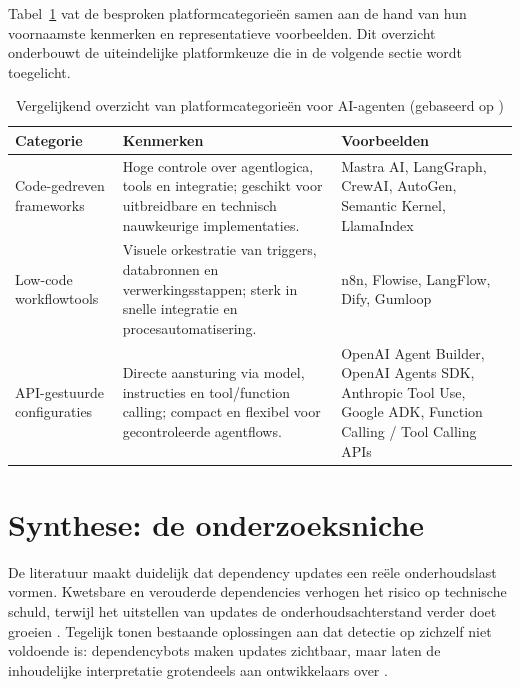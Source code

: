 Tabel~\ref{tab:platformcategorieen} vat de besproken platformcategorieën samen aan de hand van hun voornaamste kenmerken en representatieve voorbeelden. Dit overzicht onderbouwt de uiteindelijke platformkeuze die in de volgende sectie wordt toegelicht.

\begin{table}[h]
\centering
\caption{Vergelijkend overzicht van platformcategorieën voor AI-agenten (gebaseerd op \cite{turing2026frameworks, nair2025agentic, langflow2025guide, anthropic_tool_use, openai_agents_sdk})}
\label{tab:platformcategorieen}
\begin{tabular}{p{3.2cm} p{5.2cm} p{5.2cm}}
\hline
\textbf{Categorie} & \textbf{Kenmerken} & \textbf{Voorbeelden} \\
\hline
Code-gedreven frameworks &
Hoge controle over agentlogica, tools en integratie; geschikt voor uitbreidbare en technisch nauwkeurige implementaties. &
Mastra AI, LangGraph, CrewAI, AutoGen, Semantic Kernel, LlamaIndex \\

Low-code workflowtools &
Visuele orkestratie van triggers, databronnen en verwerkingsstappen; sterk in snelle integratie en procesautomatisering. &
n8n, Flowise, LangFlow, Dify, Gumloop \\

API-gestuurde configuraties &
Directe aansturing via model, instructies en tool/function calling; compact en flexibel voor gecontroleerde agentflows. &
OpenAI Agent Builder, OpenAI Agents SDK, Anthropic Tool Use, Google ADK, Function Calling / Tool Calling APIs \\
\hline
\end{tabular}
\end{table}

\section{Synthese: de onderzoeksniche}
\label{sec: onderzoeksniche}

De literatuur maakt duidelijk dat dependency updates een reële onderhoudslast vormen. Kwetsbare en verouderde dependencies verhogen het risico op technische schuld, terwijl het uitstellen van updates de onderhoudsachterstand verder doet groeien \textcite{Pashchenko2018,Behutiye2024,Ruiz2024,Chalmers2020}. Tegelijk tonen bestaande oplossingen aan dat detectie op zichzelf niet voldoende is: dependencybots maken updates zichtbaar, maar laten de inhoudelijke interpretatie grotendeels aan ontwikkelaars over \textcite{Erlenhov2022}.

